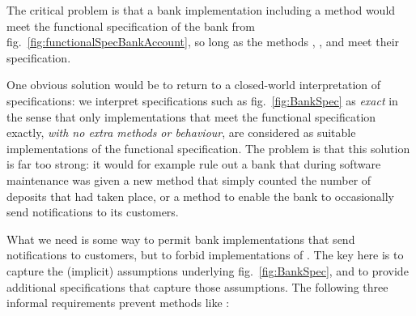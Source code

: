  
The critical problem is that a bank implementation including a 
method would meet the functional specification of the bank from
fig.~\ref{fig:functionalSpecBankAccount}, so long as the methods ,
, and     meet
their specification.

One obvious solution would be to return to a closed-world
interpretation of specifications: we interpret specifications such as
fig.~\ref{fig:BankSpec} as \emph{exact} in the sense that only
implementations that meet the functional specification exactly,
\emph{with no extra methods or behaviour}, are considered as suitable
implementations of the functional specification. The problem is that
this solution is far too strong: it would for example rule out a bank
that  during software maintenance was given a new method 
that simply counted the number of deposits that had taken place, or a method 
to enable the bank to occasionally send notifications  to its customers.
%
%


What we need is some way to permit bank implementations that 
send notifications to customers, but to forbid implementations of . %
The key here is to capture the (implicit)
assumptions underlying fig.~\ref{fig:BankSpec}, and to provide
additional specifications that capture those assumptions.  The following
 three informal requirements   prevent methods like :

